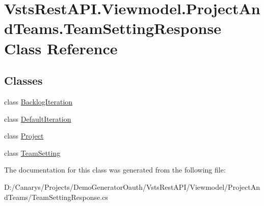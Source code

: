 \hypertarget{class_vsts_rest_a_p_i_1_1_viewmodel_1_1_project_and_teams_1_1_team_setting_response}{}\section{Vsts\+Rest\+A\+P\+I.\+Viewmodel.\+Project\+And\+Teams.\+Team\+Setting\+Response Class Reference}
\label{class_vsts_rest_a_p_i_1_1_viewmodel_1_1_project_and_teams_1_1_team_setting_response}
\subsection*{Classes}
\begin{DoxyCompactItemize}
\item 
class \mbox{\hyperlink{class_vsts_rest_a_p_i_1_1_viewmodel_1_1_project_and_teams_1_1_team_setting_response_1_1_backlog_iteration}{Backlog\+Iteration}}
\item 
class \mbox{\hyperlink{class_vsts_rest_a_p_i_1_1_viewmodel_1_1_project_and_teams_1_1_team_setting_response_1_1_default_iteration}{Default\+Iteration}}
\item 
class \mbox{\hyperlink{class_vsts_rest_a_p_i_1_1_viewmodel_1_1_project_and_teams_1_1_team_setting_response_1_1_project}{Project}}
\item 
class \mbox{\hyperlink{class_vsts_rest_a_p_i_1_1_viewmodel_1_1_project_and_teams_1_1_team_setting_response_1_1_team_setting}{Team\+Setting}}
\end{DoxyCompactItemize}


The documentation for this class was generated from the following file\+:\begin{DoxyCompactItemize}
\item 
D\+:/\+Canarys/\+Projects/\+Demo\+Generator\+Oauth/\+Vsts\+Rest\+A\+P\+I/\+Viewmodel/\+Project\+And\+Teams/Team\+Setting\+Response.\+cs\end{DoxyCompactItemize}
